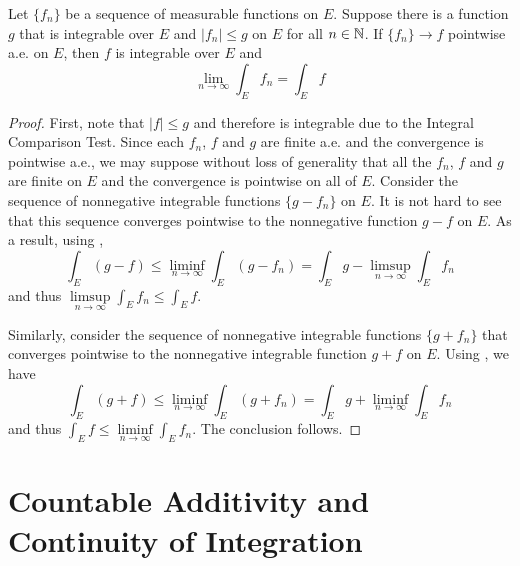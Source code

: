 \begin{theorem}
    Let $\{f_n\}$ be a sequence of measurable functions on $E$. Suppose there is a function $g$ that is integrable over $E$ and $|f_n|\le g$ on $E$ for all $n\in\mathbb{N}$. If $\{f_n\}\to f$ pointwise a.e. on $E$, then $f$ is integrable over $E$ and 
    \begin{equation*}
        \lim_{n\to\infty}\int_E f_n = \int_E f
    \end{equation*}
\end{theorem}
\begin{proof}
    First, note that $|f|\le g$ and therefore is integrable due to the Integral Comparison Test. Since each $f_n$, $f$ and $g$ are finite a.e. and the convergence is pointwise a.e., we may suppose without loss of generality that all the $f_n$, $f$ and $g$ are finite on $E$ and the convergence is pointwise on all of $E$. Consider the sequence of nonnegative integrable functions $\{g - f_n\}$ on $E$. It is not hard to see that this sequence converges pointwise to the nonnegative function $g - f$ on $E$. As a result, using , 
    \begin{equation*}
        \int_E (g - f)\le\liminf_{n\to\infty}\int_E(g - f_n) = \int_E g - \limsup_{n\to\infty}\int_E f_n
    \end{equation*}
    and thus $\limsup\limits_{n\to\infty}\int_E f_n\le\int_E f$.

    Similarly, consider the sequence of nonnegative integrable functions $\{g + f_n\}$ that converges pointwise to the nonnegative integrable function $g + f$ on $E$. Using , we have 
    \begin{equation*}
        \int_E (g + f)\le\liminf_{n\to\infty}\int_E(g + f_n) = \int_E g + \liminf_{n\to\infty}\int_E f_n
    \end{equation*}
    and thus $\int_E f\le\liminf\limits_{n\to\infty} \int_E f_n$. The conclusion follows.
\end{proof}

\section{Countable Additivity and Continuity of Integration}

